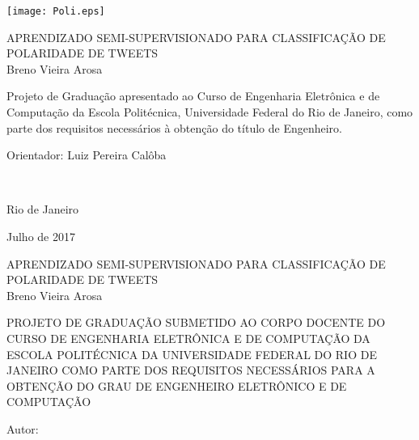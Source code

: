 \texttt{[image: Poli.eps]}

\begin{center}
\large{APRENDIZADO SEMI-SUPERVISIONADO PARA CLASSIFICAÇÃO DE POLARIDADE DE TWEETS}\\
   \vspace{2cm}
\large{Breno Vieira Arosa}\\
\end{center}
   \vspace{3cm}
\hspace{7cm}
\hfill \parbox{8.0cm}{Projeto de Graduação apresentado ao Curso de Engenharia Eletrônica e de Computação da Escola Politécnica, Universidade Federal do Rio de Janeiro, como parte dos requisitos necessários à obtenção do título de Engenheiro.\\}
   \vspace{2cm}
\hfill \parbox{8.0cm}{Orientador: Luiz Pereira Calôba} \\
   \vspace{2cm}
\begin{center}
Rio de Janeiro

Julho de 2017
\end{center}




\pagebreak


\begin{center}
\large{APRENDIZADO SEMI-SUPERVISIONADO PARA CLASSIFICAÇÃO DE POLARIDADE DE TWEETS}\\
   \vspace{1cm}
\large{Breno Vieira Arosa}\\
\end{center}
   \vspace{2cm}
PROJETO DE GRADUAÇÃO SUBMETIDO AO CORPO DOCENTE DO CURSO DE ENGENHARIA ELETRÔNICA E DE COMPUTAÇÃO DA ESCOLA POLITÉCNICA DA UNIVERSIDADE FEDERAL DO RIO DE JANEIRO COMO PARTE DOS REQUISITOS NECESSÁRIOS PARA A OBTENÇÃO DO GRAU DE ENGENHEIRO ELETRÔNICO E DE COMPUTAÇÃO

   \vspace{1cm}
Autor:
      \vspace{0.5cm}
      \begin{flushright}
         \parbox{10cm}{
            \hrulefill

            \vspace{-.375cm}

            \vspace{0.1cm}
         }
      \end{flushright}


